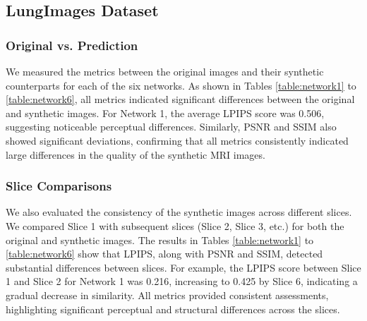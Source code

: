 \documentclass[a4paper,12pt]{article}
\begin{document}




\subsection{LungImages Dataset}

\subsubsection{Original vs. Prediction}

We measured the metrics between the original images and their synthetic counterparts for each of the six networks. As shown in Tables \ref{table:network1} to \ref{table:network6}, all metrics indicated significant differences between the original and synthetic images. For Network 1, the average LPIPS score was 0.506, suggesting noticeable perceptual differences. Similarly, PSNR and SSIM also showed significant deviations, confirming that all metrics consistently indicated large differences in the quality of the synthetic MRI images.

\subsubsection{Slice Comparisons}

We also evaluated the consistency of the synthetic images across different slices. We compared Slice 1 with subsequent slices (Slice 2, Slice 3, etc.) for both the original and synthetic images. The results in Tables \ref{table:network1} to \ref{table:network6} show that LPIPS, along with PSNR and SSIM, detected substantial differences between slices. For example, the LPIPS score between Slice 1 and Slice 2 for Network 1 was 0.216, increasing to 0.425 by Slice 6, indicating a gradual decrease in similarity. All metrics provided consistent assessments, highlighting significant perceptual and structural differences across the slices.
\end{document}
